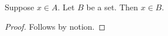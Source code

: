 \begin{proposition}\label{notion_equality_missing}
    Suppose $x\in A$.
    Let $B$ be a set.
    Then $x\in B$.
\end{proposition}
\begin{proof}
    Follows by notion.
\end{proof}
